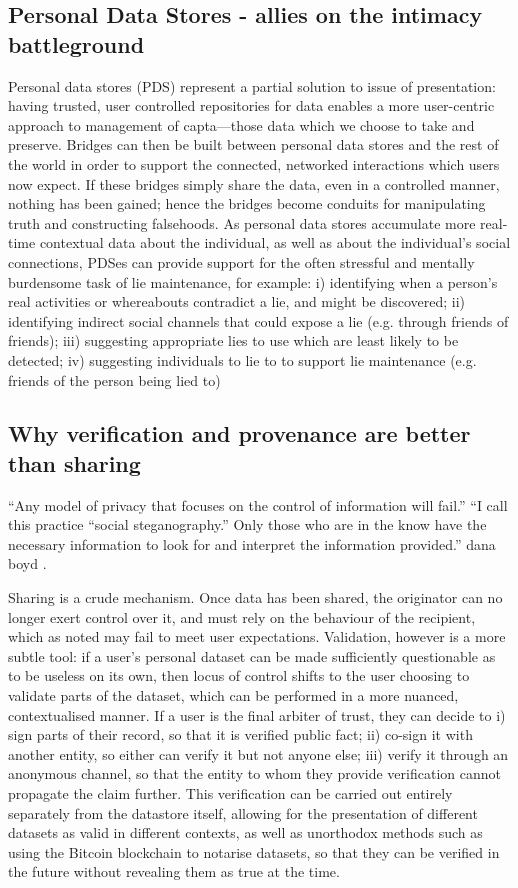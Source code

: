 \documentclass{IOS-Book-Article}     %
\begin{document}
\subsection{Personal Data Stores - allies on the intimacy battleground}

Personal data stores (PDS) represent a partial solution to issue of
presentation: having trusted, user controlled repositories for data enables a
more user-centric approach to management of capta---those data which we choose
to take and preserve. Bridges can then be built between personal data stores and
the rest of the world in order to support the connected, networked interactions
which users now expect. If these bridges simply share the data, even in a
controlled manner, nothing has been gained; hence the bridges become conduits
for manipulating truth and constructing falsehoods. As personal data stores
accumulate more real-time contextual data about the individual, as well as about
the individual’s social connections, PDSes can provide support for the often
stressful and mentally burdensome task of lie maintenance, for example: i)
identifying when a person's real activities or whereabouts contradict a lie, and
might be discovered; ii) identifying indirect social channels that could expose
a lie (e.g. through friends of friends); iii) suggesting appropriate lies to use
which are least likely to be detected; iv) suggesting individuals to lie to to
support lie maintenance (e.g. friends of the person being lied to)

\subsection{Why verification and provenance are better than sharing}

``Any model of privacy that focuses on the control of information will fail.''
``I call this practice “social steganography.” Only 
those who are in the know have the necessary information to look for and interpret the information 
provided.''
dana boyd \cite{boyd2012Networked}.

Sharing is a crude mechanism. Once data has been shared, the originator can no
longer exert control over it, and must rely on the behaviour of the recipient,
which as noted may fail to meet user expectations. Validation, however is a more
subtle tool: if a user’s personal dataset can be made sufficiently questionable
as to be useless on its own, then locus of control shifts to the user choosing
to validate parts of the dataset, which can be performed in a more nuanced,
contextualised manner. If a user is the final arbiter of trust, they can decide
to i) sign parts of their record, so that it is verified public fact; ii)
co-sign it with another entity, so either can verify it but not anyone else;
iii) verify it through an anonymous channel, so that the entity to whom they
provide verification cannot propagate the claim further. This verification can
be carried out entirely separately from the datastore itself, allowing for the
presentation of different datasets as valid  in different contexts, as well as
unorthodox methods such as using the Bitcoin blockchain to notarise datasets, so
that they can be verified in the future without revealing them as true at the
time.
\end{document}
